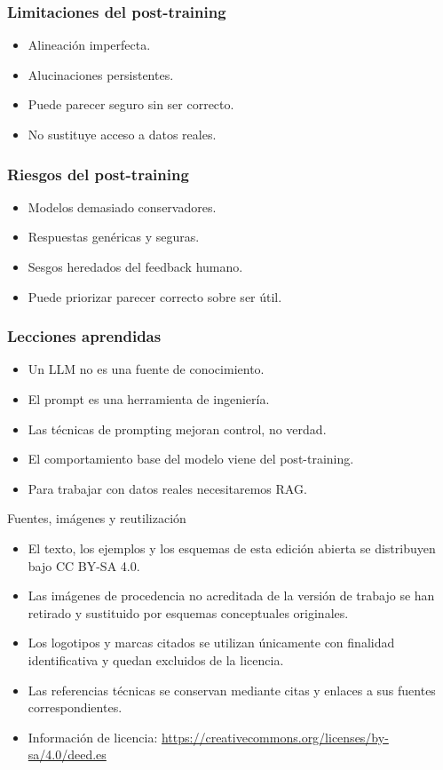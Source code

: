 \documentclass[aspectratio=169]{beamer}
\begin{document}
\begin{frame}\frametitle{Limitaciones del post-training}
\begin{itemize}
    \item Alineación imperfecta.
    \item Alucinaciones persistentes.
    \item Puede parecer seguro sin ser correcto.
    \item No sustituye acceso a datos reales.
\end{itemize}
\end{frame}

\begin{frame}\frametitle{Riesgos del post-training}
\begin{itemize}
    \item Modelos demasiado conservadores.
    \item Respuestas genéricas y seguras.
    \item Sesgos heredados del feedback humano.
    \item Puede priorizar parecer correcto sobre ser útil.
\end{itemize}
\end{frame}

\begin{frame}\frametitle{Lecciones aprendidas}
\begin{itemize}
    \item Un LLM no es una fuente de conocimiento.
    \item El prompt es una herramienta de ingeniería.
    \item Las técnicas de prompting mejoran control, no verdad.
    \item El comportamiento base del modelo viene del post-training.
    \item Para trabajar con datos reales necesitaremos RAG.
\end{itemize}
\end{frame}



\begin{frame}{Fuentes, imágenes y reutilización}
\small
\begin{itemize}
  \item El texto, los ejemplos y los esquemas de esta edición abierta se distribuyen bajo CC BY-SA 4.0.
  \item Las imágenes de procedencia no acreditada de la versión de trabajo se han retirado y sustituido por esquemas conceptuales originales.
  \item Los logotipos y marcas citados se utilizan únicamente con finalidad identificativa y quedan excluidos de la licencia.
  \item Las referencias técnicas se conservan mediante citas y enlaces a sus fuentes correspondientes.
  \item Información de licencia: \url{https://creativecommons.org/licenses/by-sa/4.0/deed.es}
\end{itemize}
\end{frame}
\end{document}
